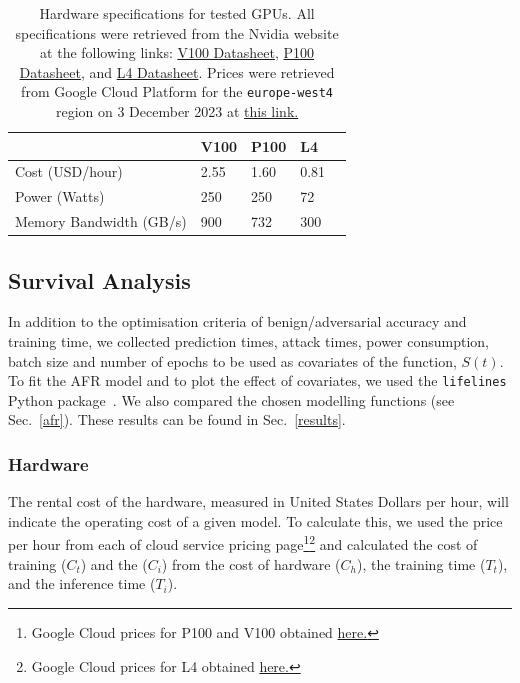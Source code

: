 \documentclass[conference]{IEEEtran}
\begin{document}
\begin{table}[h]
    \centering
    \begin{tabular}{lllll}
    \toprule
                            & V100   & P100   & L4    &  \\
    \midrule
    Cost (USD/hour)         & 2.55   & 1.60   & 0.81   &  \\
    Power (Watts)           & 250    & 250    & 72    &  \\
    Memory Bandwidth (GB/s) & 900    & 732    & 300   &  \\
    \bottomrule
    \end{tabular}
    \caption{Hardware specifications for tested GPUs. All specifications were retrieved from the Nvidia website at the following links: 
    \href{https://images.nvidia.com/content/technologies/volta/pdf/volta-v100-datasheet-update-us-1165301-r5.pdf}{V100 Datasheet},
    \href{https://images.nvidia.com/content/tesla/pdf/nvidia-tesla-p100-PCIe-datasheet.pdf}{P100 Datasheet}, and
    \href{https://nvdam.widen.net/s/rvq98gbwsw/l4-datasheet-2595652}{L4 Datasheet}. Prices were retrieved from Google Cloud Platform for the \texttt{europe-west4} region on 3 December 2023 at \href{https://cloud.google.com/pricing/list}{this link.}
    }
    \label{tab:hardware}
\end{table}

\subsection{Survival Analysis}
In addition to the optimisation criteria of benign/adversarial accuracy and training time, we collected prediction times, attack times, power consumption, batch size and number of epochs to be used as covariates of the function, $S(t)$. To fit the AFR model and to plot the effect of covariates, we used the \texttt{lifelines} Python package~\cite{lifelines}. We also compared the chosen modelling functions (see Sec.~\ref{afr}).  These results can be found in Sec.~\ref{results}.



\subsubsection{Hardware}
The rental cost of the hardware, measured in United States Dollars per hour, will indicate the operating cost of a given model. To calculate this, we used the price per hour from each of cloud service pricing page\footnote{Google Cloud prices for P100 and V100 obtained \href{https://cloud.google.com/compute/gpus-pricing}{here.}}\footnote{Google Cloud prices for L4 obtained  \href{https://cloud.google.com/compute/vm-instance-pricing\#accelerator-optimized}{here.}} and calculated the cost of training ($C_{t}$) and the ($C_{i}$) from the cost of hardware ($C_{h}$), the training time ($T_{t}$), and the inference time ($T_{i}$).
\end{document}
